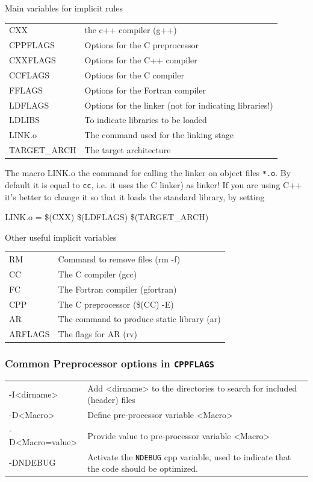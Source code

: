 \documentclass[10pt,aspectratio=169]{beamer}
\newcommand{\blue}{\color{blue}}
\begin{document}
\begin{frame}{Main variables for implicit rules}
\begin{tabular}{>{\ttfamily}l|l} CXX & the c++ compiler (g++)\\
  CPPFLAGS & Options for the C preprocessor\\
  CXXFLAGS & Options for the
             C++ compiler\\
  CCFLAGS & Options for the C compiler\\
  FFLAGS & Options for the Fortran compiler\\
  LDFLAGS & Options for the linker \alert{(not for indicating libraries!)}\\   LDLIBS & To indicate libraries to be loaded\\
  LINK.o & The command used for the linking stage\\
  TARGET\_ARCH & The target architecture\\
\end{tabular}
\medskip

The macro \alert{LINK.o} the command for calling the {\blue linker}
on object files \texttt{*.o}. By default it is equal to \texttt{cc}, i.e. it uses the C linker) as linker! If you are using C++ it's better to change it so that it loads the standard library, by setting
\begin{semiverbatim}
    LINK.o = \$(CXX) \$(LDFLAGS) \$(TARGET\_ARCH)
\end{semiverbatim}

\smallskip
\end{frame}

\begin{frame}{Other useful implicit variables}

  \begin{tabular}{>{\ttfamily}l|l}
RM & Command to remove files (rm -f)\\
CC & The C compiler (gcc)\\
    FC & The Fortran compiler (gfortran)\\
    CPP & The C preprocessor (\$(CC) -E)\\
    AR  & The command to produce static library (ar)\\
    ARFLAGS & The flags for AR (rv)
\end{tabular}
\end{frame}

\begin{frame}
  \frametitle{Common Preprocessor options in \texttt{CPPFLAGS}}
 \hspace*{-0.5cm}
  \begin{tabular}{>{\ttfamily}l|p{}}
    -I<dirname> & Add <dirname> to the directories to search for included (header) files\\
    -D<Macro> & Define pre-processor variable <Macro>\\
    -D<Macro=value> & Provide value to pre-processor variable <Macro>\\
    -DNDEBUG & Activate the \texttt{NDEBUG} cpp variable, used
               to indicate that the code should be optimized.
  \end{tabular}  
\end{frame}
\end{document}
